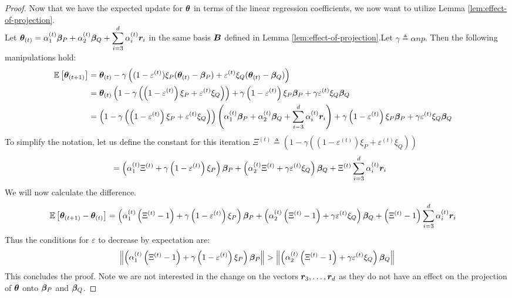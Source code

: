 \documentclass{article} %
\newcommand{\norm}[1]{\left\lVert#1\right\rVert}
\begin{document}
\begin{appendices}
\begin{proof}
		\endgroup
		Now that we have the expected update for ${\bm{\theta}}$ in terms of the linear regression coefficients, we now want to utilize Lemma \ref{lem:effect-of-projection}.\\
		Let $\displaystyle {\bm{\theta}}_{(t)} = \alpha_1^{(t)}{\bm{\beta}}_P + \alpha_2^{(t)}{\bm{\beta}}_Q + \sum_{i=3}^{d}\alpha_i^{(t)} {\bm{r}}_i$ in the same basis ${\bm{B}}$ defined in Lemma \ref{lem:effect-of-projection}.Let $\gamma \triangleq \alpha np$. Then the following manipulations hold:
		\begin{align*}
			\mathbb{E}\left[{\bm{\theta}}_{(t+1)}\right] &= {\bm{\theta}}_{(t)} - \gamma \left( (1-\varepsilon^{(t)})\xi_P({\bm{\theta}}_{(t)} - {\bm{\beta}}_P ) + \varepsilon^{(t)}\xi_Q({\bm{\theta}}_{(t)} - {\bm{\beta}}_Q)\right) &&\\
			&= {\bm{\theta}}_{(t)}\left(1 - \gamma\left(\left(1 - \varepsilon^{(t)}\right)\xi_P + \varepsilon^{(t)}\xi_Q\right)\right) + \gamma \left(1 - \varepsilon^{(t)}\right)\xi_P{\bm{\beta}}_P + \gamma \varepsilon^{(t)} \xi_Q {\bm{\beta}}_Q&&\\
			&= \left(1 - \gamma\left(\left(1 - \varepsilon^{(t)}\right)\xi_P + \varepsilon^{(t)}\xi_Q\right)\right)\left(\alpha_1^{(t)} {\bm{\beta}}_P + \alpha_2^{(t)} {\bm{\beta}}_Q + \sum_{i=3}^d\alpha_i^{(t)}{\bm{r}}_i\right) + \gamma \left(1 - \varepsilon^{(t)}\right)\xi_P{\bm{\beta}}_P + \gamma \varepsilon^{(t)} \xi_Q {\bm{\beta}}_Q &&
		\end{align*}
		To simplify the notation, let us define the constant for this iteration $\displaystyle \Xi^{(t)} \triangleq \left(1 - \gamma\left(\left(1 - \varepsilon^{(t)}\right)\xi_P + \varepsilon^{(t)}\xi_Q\right)\right)$ 
		\begin{align*}
			&= \left(\alpha_1^{(t)}\Xi^{(t)} + \gamma\left(1-\varepsilon^{(t)}\right)\xi_P\right){\bm{\beta}}_P + \left(\alpha_2^{(t)}\Xi^{(t)} + \gamma \varepsilon^{(t)}\xi_Q\right){\bm{\beta}}_Q + \Xi^{(t)}\sum_{i=3}^d\alpha_i^{(t)}{\bm{r}}_i &&
		\end{align*}
		We will now calculate the difference. 
		\begin{align*}
			\mathbb{E}\left[{\bm{\theta}}_{(t+1)} - {\bm{\theta}}_{(t)}\right] &= \left(\alpha_1^{(t)}\left(\Xi^{(t)}-1\right) + \gamma\left(1-\varepsilon^{(t)}\right)\xi_P\right){\bm{\beta}}_P + \left(\alpha_2^{(t)}\left(\Xi^{(t)}-1\right) + \gamma \varepsilon^{(t)}\xi_Q\right){\bm{\beta}}_Q + \left(\Xi^{(t)}-1\right)\sum_{i=3}^d\alpha_i^{(t)}{\bm{r}}_i&&\\
		\end{align*}
		Thus the conditions for $\varepsilon$ to decrease by expectation are:
		\begin{equation}
			\norm{\left(\alpha_1^{(t)}\left(\Xi^{(t)}-1\right) + \gamma\left(1-\varepsilon^{(t)}\right)\xi_P\right)\vbeta_P} > \norm{\left(\alpha_2^{(t)}\left(\Xi^{(t)}-1\right) + \gamma \varepsilon^{(t)}\xi_Q\right)\vbeta_Q}
		\end{equation}  
		This concludes the proof. Note we are not interested in the change on the vectors ${\bm{r}}_3, \dots, {\bm{r}}_d$ as they do not have an effect on the projection of ${\bm{\theta}}$ onto ${\bm{\beta}}_P$ and ${\bm{\beta}}_Q$. 
	\end{proof}


\end{appendices}
\end{document}
